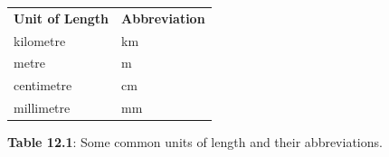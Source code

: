 {\begin{center}
{      }
      \tablelasttail{}
      \begin{xtabular}[t]{|l|l|}\hline
                \textbf{Unit of Length}
               &
                \textbf{Abbreviation}
     \tabularnewline{}
        kilometre &
        km%
     \tabularnewline{}
        metre &
        m%
     \tabularnewline{}
        centimetre &
        cm%
     \tabularnewline{}
        millimetre &
        mm%
     \tabularnewline{}
    \end{xtabular}
      \end{center}
    \begin{center}{\small\bfseries Table 12.1}: Some common units of length and their abbreviations.\end{center}
          } %
